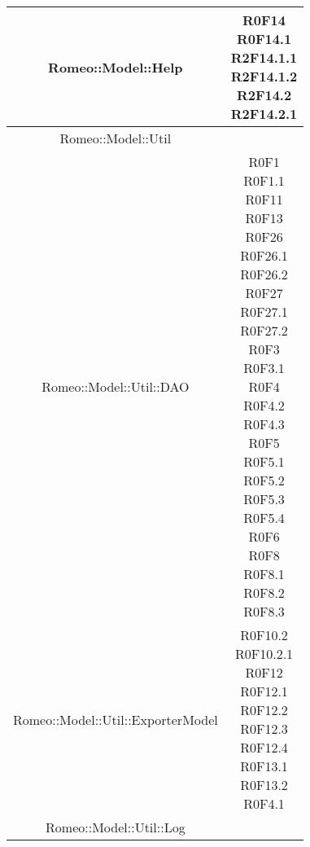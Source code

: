 \begin{center}
\begin{longtable}{|c|c|}
\hline
\parbox[t]{\larghezza}{Romeo::Model::Help}   & \parbox[t]{\larghezza}{ R0F14 \\ R0F14.1 \\ R2F14.1.1 \\ R2F14.1.2 \\ R2F14.2 \\ R2F14.2.1 \\} \\
\hline
\parbox[t]{\larghezza}{Romeo::Model::Util}   & \parbox[t]{\larghezza}{} \\
\hline
\parbox[t]{\larghezza}{Romeo::Model::Util::DAO}   & \parbox[t]{\larghezza}{ R0F1 \\ R0F1.1 \\ R0F11 \\ R0F13 \\ R0F26 \\ R0F26.1 \\ R0F26.2 \\ R0F27 \\ R0F27.1 \\ R0F27.2 \\ R0F3 \\ R0F3.1 \\ R0F4 \\ R0F4.2 \\ R0F4.3 \\ R0F5 \\ R0F5.1 \\ R0F5.2 \\ R0F5.3 \\ R0F5.4 \\ R0F6 \\ R0F8 \\ R0F8.1  \\ R0F8.2  \\ R0F8.3  \\} \\
\hline
\parbox[t]{\larghezza}{Romeo::Model::Util::ExporterModel}   & \parbox[t]{\larghezza}{ R0F10.2 \\ R0F10.2.1 \\ R0F12 \\ R0F12.1 \\ R0F12.2 \\ R0F12.3 \\ R0F12.4 \\ R0F13.1 \\ R0F13.2 \\ R0F4.1 \\} \\
\hline
\parbox[t]{\larghezza}{Romeo::Model::Util::Log}   & \parbox[t]{\larghezza}{} \\

\end{longtable}
\end{center}
